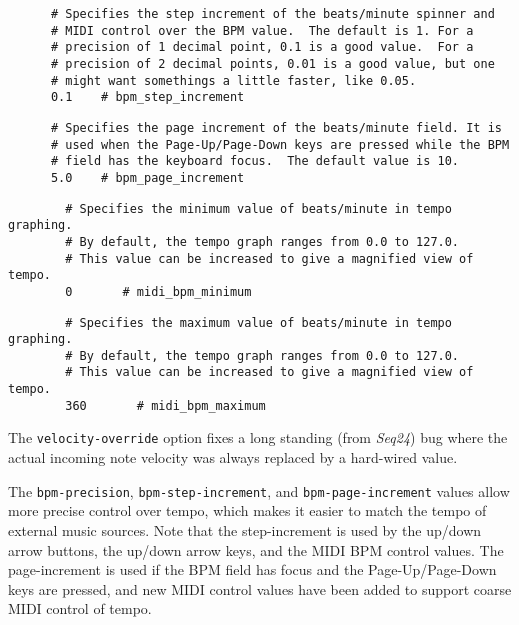    \begin{verbatim}
      # Specifies the step increment of the beats/minute spinner and
      # MIDI control over the BPM value.  The default is 1. For a
      # precision of 1 decimal point, 0.1 is a good value.  For a
      # precision of 2 decimal points, 0.01 is a good value, but one
      # might want somethings a little faster, like 0.05.
      0.1    # bpm_step_increment
   \end{verbatim}

   \begin{verbatim}
      # Specifies the page increment of the beats/minute field. It is
      # used when the Page-Up/Page-Down keys are pressed while the BPM
      # field has the keyboard focus.  The default value is 10.
      5.0    # bpm_page_increment
   \end{verbatim}

   \begin{verbatim}
		# Specifies the minimum value of beats/minute in tempo graphing.
		# By default, the tempo graph ranges from 0.0 to 127.0.
		# This value can be increased to give a magnified view of tempo.
		0       # midi_bpm_minimum
   \end{verbatim}

   \begin{verbatim}
		# Specifies the maximum value of beats/minute in tempo graphing.
		# By default, the tempo graph ranges from 0.0 to 127.0.
		# This value can be increased to give a magnified view of tempo.
		360       # midi_bpm_maximum
   \end{verbatim}

      The \texttt{velocity-override} option fixes a long standing (from
      \textsl{Seq24}) bug where the actual incoming note velocity was always
      replaced by a hard-wired value.

      The \texttt{bpm-precision}, \texttt{bpm-step-increment}, and
      \texttt{bpm-page-increment} values allow more precise control over tempo,
      which makes it easier to match the tempo of external music sources.  Note
      that the step-increment is used by the up/down arrow buttons, the up/down
      arrow keys, and the MIDI BPM control values.  The page-increment is used
      if the BPM field has focus and the Page-Up/Page-Down keys are pressed,
      and new MIDI control values have been added to support coarse MIDI
      control of tempo.

